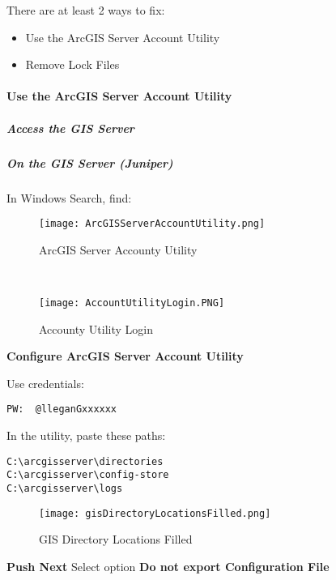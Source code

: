 \noindent There are at least 2 ways to fix:
\begin{itemize}
\item Use the ArcGIS Server Account Utility
\item Remove Lock Files
\end{itemize}
\paragraph[Use the ArcGIS Server Account Utility]{Use the ArcGIS Server Account Utility\texorpdfstring{\\}{}}
\subparagraph*{Access the GIS Server\texorpdfstring{\\}{}}
\vspace{.25in}

\vspace{.25in}

\vspace{.25in}

\clearpage
\subparagraph*{On the GIS Server (Juniper)\texorpdfstring{\\}{}}
\noindent In Windows Search, find:
\vspace{.1in}

\begin{wrapfigure}{r}{0.5\textwidth}
\centering
\texttt{[image: ArcGISServerAccountUtility.png]}
\caption{ArcGIS Server Accounty Utility}
\vspace{.25in}
\HRule \\[.4cm] %
\vspace{.25in}

\texttt{[image: AccountUtilityLogin.PNG]}
\caption{Accounty Utility Login}
\end{wrapfigure}
\noindent \textbf{Configure ArcGIS Server Account Utility}
\vspace{4in}

\noindent Use credentials:
\vspace{.35in}

\begin{verbatim}
PW:  @lleganGxxxxxx
\end{verbatim}
\clearpage
\noindent In the utility, paste these paths:
\begin{verbatim}
C:\arcgisserver\directories
C:\arcgisserver\config-store
C:\arcgisserver\logs
\end{verbatim}
\begin{figure}[h!]
\centering
\texttt{[image: gisDirectoryLocationsFilled.png]}
\caption{GIS Directory Locations Filled}
\end{figure}
\noindent\textbf{\Large Push Next}
\clearpage
\noindent Select option \textbf{Do not export Configuration File}

